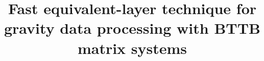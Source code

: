 \documentclass[manuscript,blind]{geophysics}
\begin{document}
\title{Fast equivalent-layer technique for gravity data processing with BTTB matrix systems}

\renewcommand{\thefootnote}{\fnsymbol{footnote}} 


%

\maketitle
















\end{document}
